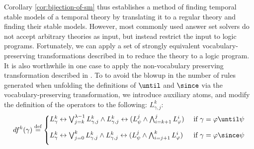 Corollary \ref{cor:bijection-of-sm} thus establishes a method of
finding temporal stable models of a temporal theory by translating it
to a regular theory and finding their stable models. However, most
commonly used answer set solvers do not accept arbitrary theories as
input, but instead restrict the input to logic programs. Fortunately,
we can apply a set of strongly equivalent vocabulary-preserving
transformations described in \cite{capeva05a} to reduce the theory to
a logic program. It is also worthwhile in one case to apply the
non-vocabulary preserving transformation described in
\cite{capeva05a}. To to avoid the blowup in the number of rules
generated when unfolding the definitions of $\until$ and $\since$ via
the vocabulary-preserving transformation, we introduce auxiliary
atoms, and modify the definition of the operators to the following:
$L_{\gamma,j}^k$:
\begin{align*}
df^k(\gamma) \defeq \begin{cases}
  L^k_{\gamma} \leftrightarrow \bigvee_{j=k}^{\lambda-1}L_{\gamma,j}^k \wedge L_{\gamma,j}^k \leftrightarrow 
(L_\psi^j \wedge \bigwedge_{i=k+1}^{j}L_{\varphi}^i)
  &\text{ if } \gamma = \varphi \until \psi \\[2ex]
  L^k_{\gamma} \leftrightarrow  \bigvee_{j=0}^{k} L_{\gamma,j}^k \wedge L_{\gamma,j}^k \leftrightarrow (L_\psi^j \wedge \bigwedge_{i=j+1}^{k}L_{\varphi}^i)
  &\text{ if } \gamma = \varphi \since \psi \\[2ex]
\end{cases}
\end{align*}
